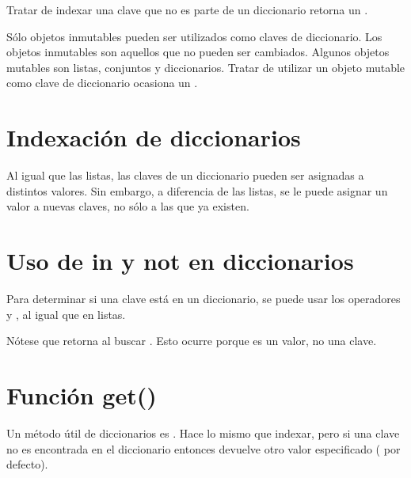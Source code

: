 Tratar de indexar una clave que no es parte de un diccionario retorna un .


Sólo objetos inmutables pueden ser utilizados como claves de diccionario.
Los objetos inmutables son aquellos que no pueden ser cambiados.
Algunos objetos mutables son listas, conjuntos y diccionarios.
Tratar de utilizar un objeto mutable como clave de diccionario ocasiona un .


\section{Indexación de diccionarios}

Al igual que las listas, las claves de un diccionario pueden ser asignadas a distintos valores.
Sin embargo, a diferencia de las listas, se le puede asignar un valor a nuevas claves, no sólo a las que ya existen.


\section{Uso de in y not en diccionarios}

Para determinar si una clave está en un diccionario, se puede usar los operadores  y , al igual que en listas.


Nótese que retorna  al buscar .
Esto ocurre porque  es un valor, no una clave.

\section{Función get()}

Un método útil de diccionarios es .
Hace lo mismo que indexar, pero si una clave no es encontrada en el diccionario entonces devuelve otro valor especificado ( por defecto).

